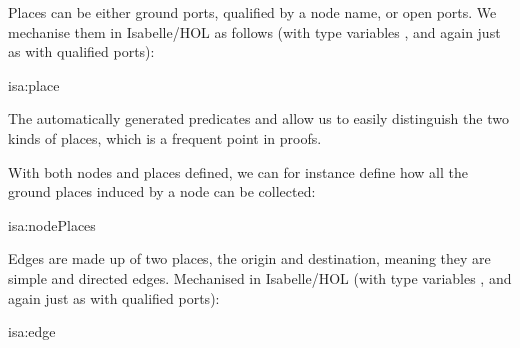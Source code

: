 \documentclass[class=smolathesis,crop=false]{standalone}
\begin{document}
Places can be either ground ports, qualified by a node name, or open ports.
We mechanise them in Isabelle/HOL as follows (with type variables ,  and  again just as with qualified ports):
\begin{isadef}{isa:place}
  
\end{isadef}
The automatically generated predicates  and  allow us to easily distinguish the two kinds of places, which is a frequent point in proofs.

With both nodes and places defined, we can for instance define how all the ground places induced by a node can be collected:
\begin{isadef}{isa:nodePlaces}
  
\end{isadef}

Edges are made up of two places, the origin and destination, meaning they are simple and directed edges.
Mechanised in Isabelle/HOL (with type variables ,  and  again just as with qualified ports):
\begin{isadef}{isa:edge}
  
\end{isadef}
\end{document}
